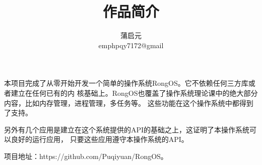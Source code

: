 \documentclass{wx672article} %
\title{作品简介}
\author{蒲启元 \\
emph{pqy7172@gmail}}
\begin{document}
\maketitle{}
本项目完成了从零开始开发一个简单的操作系统RongOS。它不依赖任何三方库或者建立在任何已有的内
核基础上。RongOS也覆盖了操作系统理论课中的绝大部分内容，比如内存管理，进程管理，多任务等。
这些功能在这个操作系统中都得到了支持。

另外有几个应用是建立在这个系统提供的API的基础之上，这证明了本操作系统可以良好的运行应用，
只要这些应用遵守本操作系统的API。

项目地址：https://github.com/Puqiyuan/RongOS。
\end{document}
